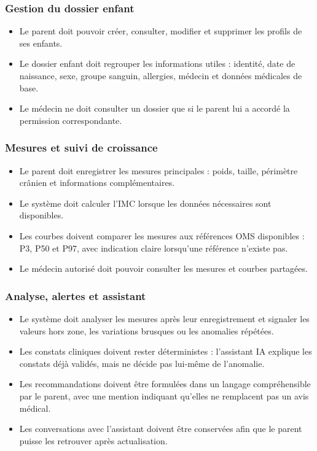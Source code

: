 \subsubsection*{Gestion du dossier enfant}
\begin{itemize}
    \item Le parent doit pouvoir créer, consulter, modifier et supprimer les profils de ses enfants.
    \item Le dossier enfant doit regrouper les informations utiles : identité, date de naissance, sexe, groupe sanguin, allergies, médecin et données médicales de base.
    \item Le médecin ne doit consulter un dossier que si le parent lui a accordé la permission correspondante.
\end{itemize}

\subsubsection*{Mesures et suivi de croissance}
\begin{itemize}
    \item Le parent doit enregistrer les mesures principales : poids, taille, périmètre crânien et informations complémentaires.
    \item Le système doit calculer l'IMC lorsque les données nécessaires sont disponibles.
    \item Les courbes doivent comparer les mesures aux références OMS disponibles : P3, P50 et P97, avec indication claire lorsqu'une référence n'existe pas.
    \item Le médecin autorisé doit pouvoir consulter les mesures et courbes partagées.
\end{itemize}

\subsubsection*{Analyse, alertes et assistant}
\begin{itemize}
    \item Le système doit analyser les mesures après leur enregistrement et signaler les valeurs hors zone, les variations brusques ou les anomalies répétées.
    \item Les constats cliniques doivent rester déterministes : l'assistant IA explique les constats déjà validés, mais ne décide pas lui-même de l'anomalie.
    \item Les recommandations doivent être formulées dans un langage compréhensible par le parent, avec une mention indiquant qu'elles ne remplacent pas un avis médical.
    \item Les conversations avec l'assistant doivent être conservées afin que le parent puisse les retrouver après actualisation.
\end{itemize}

